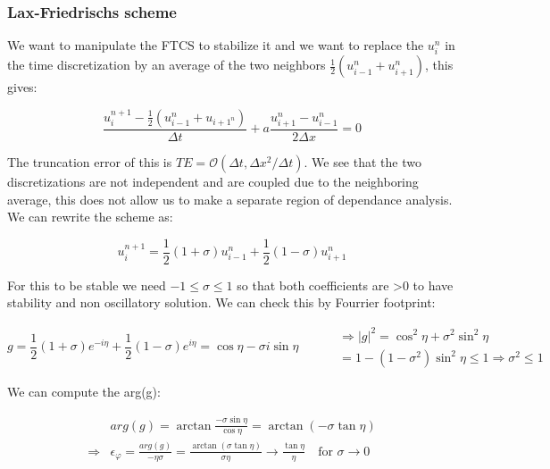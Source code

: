 \subsubsection{Lax-Friedrischs scheme}
We want to manipulate the FTCS to stabilize it and we want to replace the $u_i^n$ in the time discretization by an average of the two neighbors $\frac{1}{2} (u_{i-1}^n + u_{i+1}^n)$, this gives: 

\begin{equation}
\frac{u_i ^{n+1} - \frac{1}{2}(u_{i-1}^n + u_{i+1 ^n})}{\Delta t} + a \frac{u_{i+1}^n - u_{i-1}^n}{2\Delta x} = 0
\end{equation}

The truncation error of this is $TE = \mathcal{O} (\Delta t, \Delta x^2 / \Delta t)$. We see that the two discretizations are not independent and are coupled due to the neighboring average, this does not allow us to make a separate region of dependance analysis. We can rewrite the scheme as: 

\begin{equation}
u_i^{n+1} = \frac{1}{2} (1 + \sigma )u_{i-1}^n + \frac{1}{2} (1- \sigma ) u_{i+1}^n
\end{equation}

For this to be stable we need $-1 \leq \sigma \leq 1$ so that both coefficients are >0 to have stability and non oscillatory solution. We can check this by Fourrier footprint: 

\begin{equation}
g = \frac{1}{2} (1+\sigma) e^{-i\eta} + \frac{1}{2}(1-\sigma) e^{i\eta} = \cos \eta - \sigma i \sin \eta \qquad
\begin{aligned}
&\Rightarrow |g|^2= \cos ^2 \eta + \sigma ^2 \sin ^2 \eta \\
&= 1 - (1 - \sigma ^2)\sin ^2\eta \leq 1 \Rightarrow \sigma ^2 \leq 1
\end{aligned}
 \end{equation}
 
We can compute the arg(g): 
 
\begin{equation}
\begin{aligned}
&arg(g) = \arctan \frac{-\sigma \sin \eta}{\cos \eta} = \arctan (-\sigma \tan \eta) \\
\Rightarrow &\epsilon _\varphi = \frac{arg(g)}{-\eta \sigma} = \frac{\arctan (\sigma \tan \eta)}{\sigma \eta} \rightarrow \frac{\tan \eta}{\eta} \quad \mbox{for } \sigma \rightarrow 0
\end{aligned}
\end{equation}

